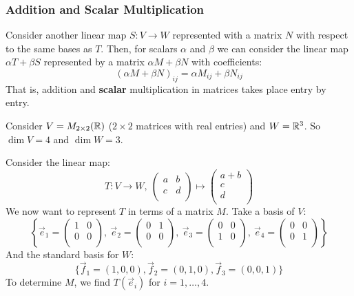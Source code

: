 \documentclass[../main.tex]{subfiles}
\begin{document}
\subsubsection{Addition and Scalar Multiplication}
Consider another linear map $S: V \to W$ represented with a matrix $N$ with respect to the same bases as $T$.
Then, for scalars $\alpha$ and $\beta$ we can consider the linear map $\alpha T + \beta S$ represented by a matrix $\alpha M + \beta N$ with coefficients:
\[
  (\alpha M + \beta N)_{i j} = \alpha M_{i j} + \beta N_{i j}
\]
That is, addition and \textbf{scalar} multiplication in matrices takes place entry by entry.
\begin{example}
  Consider $V = M_{2\times2}(\mathbb{R})$ ($2\times2$ matrices with real entries) and $W = \mathbb{R}^{3}$.
  So $\dim V = 4$ and $\dim W = 3$.

  Consider the linear map:
  \[
    T: V \to W,\ \begin{pmatrix}
    a & b \\
    c & d \\
    \end{pmatrix} \mapsto
    \begin{pmatrix}
    a + b \\
    c \\
    d \\
    \end{pmatrix}
  \]
  We now want to represent $T$ in terms of a matrix $M$.
  Take a basis of $V$:
  \[
    \left\{
    \vec{e}_1 = \begin{pmatrix}
    1 & 0 \\
    0 & 0 \\
    \end{pmatrix},\
    \vec{e}_2 = \begin{pmatrix}
    0 & 1 \\
    0 & 0 \\
    \end{pmatrix},\
    \vec{e}_3 = \begin{pmatrix}
    0 & 0 \\
    1 & 0 \\
    \end{pmatrix},\
    \vec{e}_4 = \begin{pmatrix}
    0 & 0 \\
    0 & 1 \\
    \end{pmatrix}
    \right\}
  \]
  And the standard basis for $W$:
  \[
    \{\vec{f}_1 = (1, 0, 0), \vec{f}_2 = (0, 1, 0), \vec{f}_3 = (0, 0, 1)\}
  \]
  To determine $M$, we find $T(\vec{e}_i)$ for $i = 1, \ldots, 4$.

\end{example}
\end{document}
